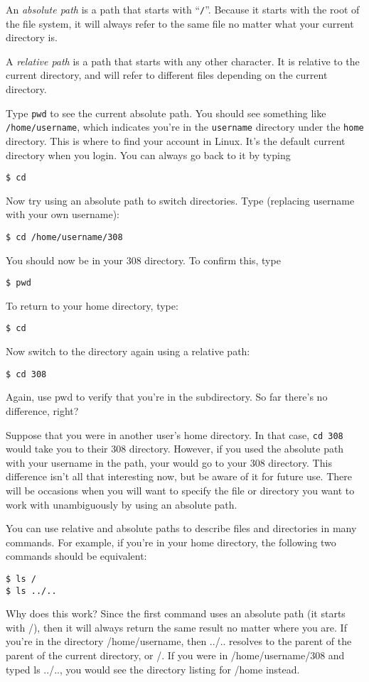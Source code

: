 \documentclass[letterpaper,10pt]{article}
\newcommand{\cmd}[1]{\texttt{#1}}
\begin{document}
An \emph{absolute path} is a path that starts with ``\texttt{/}''. Because it starts with the root of the file system, it will always refer to the same file no matter what your current directory is.

A \emph{relative path} is a path that starts with any other character. It is relative to the current directory, and will refer to different files depending on the current directory.

Type \cmd{pwd} to see the current absolute path. You should see something like \texttt{/home/username}, which indicates you're in the \texttt{username} directory under the \texttt{home} directory. This is where to find your account in Linux. It's the default current directory when you login. You can always go back to it by typing
\begin{verbatim}
$ cd
\end{verbatim}
Now try using an absolute path to switch directories. Type (replacing username with your own username):
\begin{verbatim}
$ cd /home/username/308
\end{verbatim}
You should now be in your 308 directory. To confirm this, type
\begin{verbatim}
$ pwd
\end{verbatim}
To return to your home directory, type:
\begin{verbatim}
$ cd
\end{verbatim}
Now switch to the directory again using a relative path:
\begin{verbatim}
$ cd 308
\end{verbatim}
Again, use pwd to verify that you're in the subdirectory. So far there's no difference, right?

Suppose that you were in another user's home directory. In that case, \cmd{cd 308} would take you to their 308 directory. However, if you used the absolute path with your username in the path, your would go to your 308 directory. This difference isn't all that interesting now, but be aware of it for future use. There will be occasions when you will want to specify the file or directory you want to work with unambiguously by using an absolute path.

You can use relative and absolute paths to describe files and directories in many commands. For example, if you're in your home directory, the following two commands should be equivalent:
\begin{verbatim}
$ ls /
$ ls ../..
\end{verbatim}
Why does this work? Since the first command uses an absolute path (it starts with /), then it will always return the same result no matter where you are. If you're in the directory /home/username, then ../.. resolves to the parent of the parent of the current directory, or /. If you were in /home/username/308 and typed ls ../.., you would see the directory listing for /home instead.
\end{document}
